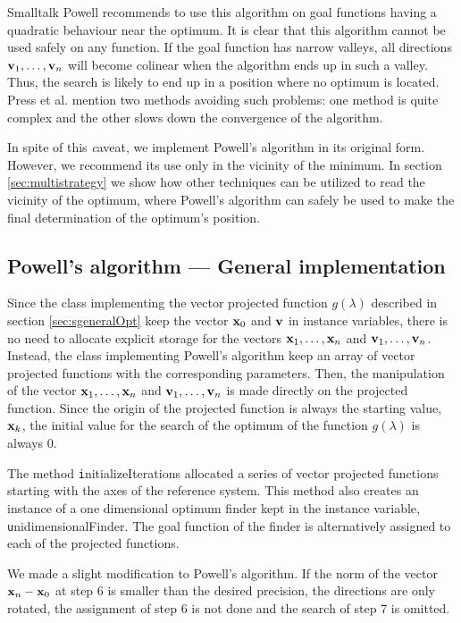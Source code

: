 \begin{displaycode}{Smalltalk}
Powell recommends to use this algorithm on goal functions having a
quadratic behaviour near the optimum. It is clear that this
algorithm cannot be used safely on any function. If the goal
function has narrow valleys, all directions ${\textbf v}_1,\ldots,{\textbf
v}_n$ will become colinear when the algorithm ends up in such a
valley. Thus, the search is likely to end up in a position where
no optimum is located. Press et al. \cite{Press} mention two
methods avoiding such problems: one method is quite complex and
the other slows down the convergence of the algorithm.

In spite of this {\textit caveat}, we implement Powell's algorithm in
its original form. However, we recommend its use only in the
vicinity of the minimum. In section \ref{sec:multistrategy} we
show how other techniques can be utilized to read the vicinity of
the optimum, where Powell's algorithm can safely be used to make
the final determination of the optimum's position.

\subsection{Powell's algorithm --- General implementation}
Since the class implementing the vector projected function
$g\left(\lambda\right)$ described in section
\ref{sec:sgeneralOpt} keep the vector
${\textbf x}_0$ and ${\textbf v}$ in instance variables, there is no need
to allocate explicit storage for the vectors ${\textbf
x}_1,\ldots,{\textbf x}_n$ and ${\textbf v}_1,\ldots,{\textbf v}_n$. Instead,
the class implementing Powell's algorithm keep an array of vector
projected functions with the corresponding parameters. Then, the
manipulation of the vector ${\textbf x}_1,\ldots,{\textbf x}_n$ and ${\textbf
v}_1,\ldots,{\textbf v}_n$ is made directly on the projected function.
Since the origin of the projected function is always the starting
value, ${\textbf x}_k$, the initial value for the search of the
optimum of the function $g\left(\lambda\right)$ is always 0.

The method {\texttt initializeIterations} allocated a series of vector
projected functions starting with the axes of the reference
system. This method also creates an instance of a one dimensional
optimum finder kept in the instance variable, {\texttt
unidimensionalFinder}. The goal function of the finder is
alternatively assigned to each of the projected functions.

We made a slight modification to Powell's algorithm. If the norm
of the vector ${\textbf x}_n-{\textbf x}_0$ at step 6 is smaller than the
desired precision, the directions are only rotated, the assignment
of step 6 is not done and the search of step 7 is omitted.


\end{displaycode}
